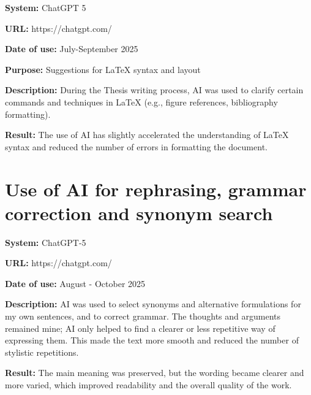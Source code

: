 \textbf{System:} ChatGPT 5

\textbf{URL:} https://chatgpt.com/

\textbf{Date of use:} July-September 2025

\textbf{Purpose:} Suggestions for LaTeX syntax and layout

\textbf{Description:}
During the Thesis writing process, AI was used to clarify certain commands
and techniques in LaTeX (e.g., figure references, bibliography
formatting).

\textbf{Result:}
The use of AI has slightly accelerated the understanding of LaTeX syntax
and reduced the number of errors in formatting the document.


\section{Use of AI for rephrasing, grammar correction and synonym search}

\textbf{System:} ChatGPT-5

\textbf{URL:} https://chatgpt.com/

\textbf{Date of use:} August - October 2025

\textbf{Description:} AI was used to select synonyms and alternative formulations
for my own sentences, and to correct grammar. The thoughts and arguments remained mine; AI only
helped to find a clearer or less repetitive way of expressing them. This made
the text more smooth and reduced the number of stylistic repetitions.

\textbf{Result:} The main meaning was preserved, but the wording became clearer
and more varied, which improved readability and the overall quality of the
work.
